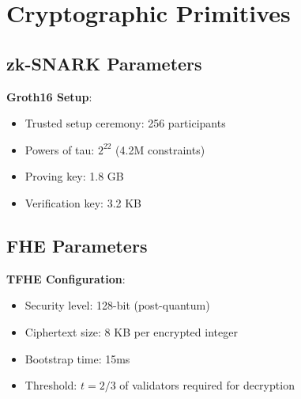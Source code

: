 \section{Cryptographic Primitives}


\subsection{zk-SNARK Parameters}

\textbf{Groth16 Setup}:
\begin{itemize}[leftmargin=1.1em]
  \item Trusted setup ceremony: 256 participants
  \item Powers of tau: $2^{22}$ (4.2M constraints)
  \item Proving key: 1.8 GB
  \item Verification key: 3.2 KB
\end{itemize}

\subsection{FHE Parameters}

\textbf{TFHE Configuration}:
\begin{itemize}[leftmargin=1.1em]
  \item Security level: 128-bit (post-quantum)
  \item Ciphertext size: 8 KB per encrypted integer
  \item Bootstrap time: 15ms
  \item Threshold: $t = 2/3$ of validators required for decryption
\end{itemize}

